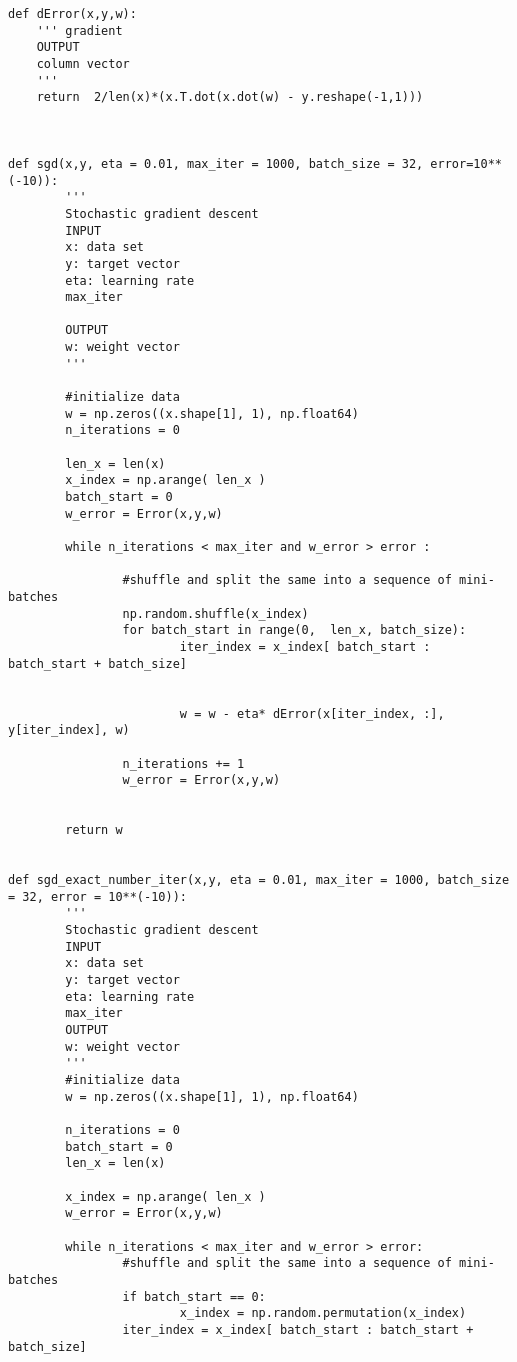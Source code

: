 \begin{verbatim}
def dError(x,y,w):
    ''' gradient
    OUTPUT
    column vector
    '''
    return  2/len(x)*(x.T.dot(x.dot(w) - y.reshape(-1,1)))
    


def sgd(x,y, eta = 0.01, max_iter = 1000, batch_size = 32, error=10**(-10)):
        '''
        Stochastic gradient descent
        INPUT 
        x: data set
        y: target vector
        eta: learning rate
        max_iter 

        OUTPUT 
        w: weight vector
        '''
  
        #initialize data
        w = np.zeros((x.shape[1], 1), np.float64)
        n_iterations = 0

        len_x = len(x)
        x_index = np.arange( len_x )
        batch_start = 0
        w_error = Error(x,y,w)

        while n_iterations < max_iter and w_error > error :
  
                #shuffle and split the same into a sequence of mini-batches
                np.random.shuffle(x_index)
                for batch_start in range(0,  len_x, batch_size):
                        iter_index = x_index[ batch_start : batch_start + batch_size]

        
                        w = w - eta* dError(x[iter_index, :], y[iter_index], w)
        
                n_iterations += 1
                w_error = Error(x,y,w)

   
        return w


def sgd_exact_number_iter(x,y, eta = 0.01, max_iter = 1000, batch_size = 32, error = 10**(-10)):
        '''
        Stochastic gradient descent
        INPUT 
        x: data set
        y: target vector
        eta: learning rate
        max_iter 
        OUTPUT 
        w: weight vector
        '''
        #initialize data
        w = np.zeros((x.shape[1], 1), np.float64)
    
        n_iterations = 0
        batch_start = 0
        len_x = len(x)
    
        x_index = np.arange( len_x )
        w_error = Error(x,y,w)
 
        while n_iterations < max_iter and w_error > error:
                #shuffle and split the same into a sequence of mini-batches
                if batch_start == 0:
                        x_index = np.random.permutation(x_index)
                iter_index = x_index[ batch_start : batch_start + batch_size]


\end{verbatim}
